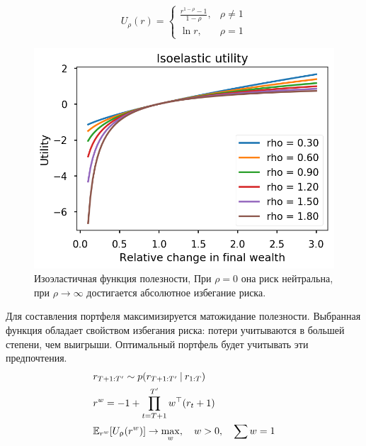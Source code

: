\begin{minipage}{0.4\linewidth}
\begin{equation}
U_\rho(r) = \begin{cases}
\frac{r^{1-\rho}-1}{1-\rho}, &\rho\ne 1\\
\ln r, &\rho = 1
\end{cases}
\label{eq:isoelastic}
\end{equation}
\end{minipage}
\begin{minipage}{0.5\linewidth}
	\begin{figure}[H]
		\centering
		\includegraphics[width=0.7\linewidth]{Thesis/images/isoelastic}
		\caption{Изоэластичная функция полезности, При $\rho=0$ она риск нейтральна, при $\rho \to \infty$ достигается абсолютное избегание риска.}
		\label{fig:isoelastic}	
	\end{figure}
\end{minipage}
\vspace{.5cm}

 Для составления портфеля максимизируется  матожидание полезности. Выбранная функция обладает свойством избегания риска: потери учитываются в большей степени, чем выигрыши. Оптимальный портфель будет учитывать эти предпочтения.
\begin{align}
&r_{T+1:T'} \sim p(r_{T+1:T'}\cond r_{1:T})\\
&r^w = -1 + \prod_{t=T+1}^{T'} w^\top(r_t + 1)\\
&\Eb[r^w]{U_\rho(r^w)} \to \max_w, \quad w>0,\quad \sum w = 1
\end{align}
